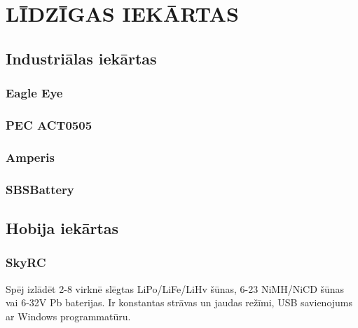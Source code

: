 \documentclass[12pt,fleqn,titlepage,oneside]{article}
\numberwithin{equation}{section}
\numberwithin{figure}{section}
\numberwithin{table}{section}
\begin{document}
\FloatBarrier
\newpage
\section{\texorpdfstring{\MakeUppercase{Līdzīgas iekārtas}}{Līdzīgas iekārtas}}

\subsection{Industriālas iekārtas}

\subsubsection{Eagle Eye}

\subsubsection{PEC ACT0505} 

\subsubsection{Amperis}

\subsubsection{SBSBattery}

\subsection{Hobija iekārtas}

\subsubsection{SkyRC}

Spēj izlādēt 2-8 virknē slēgtas LiPo/LiFe/LiHv šūnas, 6-23 NiMH/NiCD šūnas vai 6-32V Pb baterijas.
Ir konstantas strāvas un jaudas režīmi, USB savienojums ar Windows programmatūru.
\end{document}
